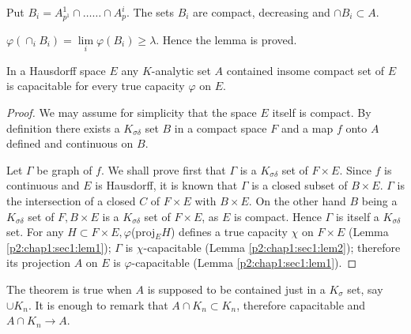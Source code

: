 Put $B_i = A^1_{p^1} \cap \ldots \ldots \cap A^i_{p}$. The sets $B_i$
are compact, decreasing and $\cap B_i \subset A$.  

$\varphi(\cap_i B_i) = \lim\limits_i \varphi (B_i) \geq
\lambda$. Hence the lemma is proved. 

\begin{thm} \label{p2:chap1:sec1:thm1}%
  In a Hausdorff space $E$ any $K$-analytic set $A$ contained in\pageoriginale some
  compact set of $E$ is capacitable for every true capacity $\varphi$
  on $E$. 
\end{thm}

\begin{proof} %
  We may assume for simplicity that the space $E$ itself is compact.
By definition there exists a $K_{\sigma \delta}$ set $B$ in a compact
space $F$ and a map $f$ onto $A$ defined and continuous on $B$. 

Let $\Gamma$ be graph of $f$. We shall prove first that $\Gamma$ is a
$K_{\sigma \delta} $ set of $F \times E$. Since $f$ is continuous and
$E$ is Hausdorff, it is known that  $\Gamma$ is a closed subset of $B
\times E$.  $\Gamma$ is the intersection of a closed $C$ of $F \times
E$ with $B \times E$. On the other hand $B$ being a $K_{\sigma \delta}
$ set of $ F, B \times E$ is a $K_{\sigma \delta} $ set of $F \times
E$, as $E$ is compact. 
Hence $\Gamma$ is itself a $K_{\sigma \delta} $ set. For any $H
\subset F \times E, \varphi$(proj$_E H$) defines a true capacity
$\chi$ on $F \times E$ (Lemma \ref{p2:chap1:sec1:lem1}); 
$\Gamma$ is $\chi$-capacitable (Lemma
\ref{p2:chap1:sec1:lem2}); therefore its projection $A$ on $E$ is
$\varphi$-capacitable (Lemma \ref{p2:chap1:sec1:lem1}). 
\end{proof}

\begin{remark*} %
  The theorem is true when $A$ is supposed to be contained just in a
  $K_{\sigma}$ set, say $\cup K_n$. It is enough to remark that $A
  \cap K_n \subset K_n$, therefore capacitable and $A \cap K_n \to
  A$. 
\end{remark*}
